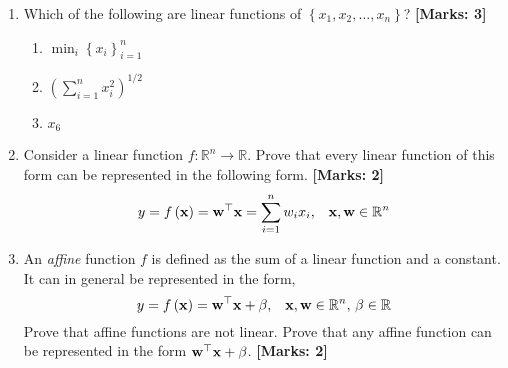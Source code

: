 \documentclass[12pt]{article}
\def\mf{\ensuremath\mathbf}
\begin{document}
\begin{enumerate}
    \item Which of the following are linear functions of $\left\{x_1, x_2, \ldots,x_n\right\}$? \textbf{[Marks: 3]}
    \begin{enumerate}
        \item $\min_i \left\{x_i\right\}_{i=1}^{n}$
        \item $\left(\sum_{i=1}^n x_i^2\right)^{1/2}$
        \item $x_6$
    \end{enumerate}
    
    \item Consider a linear function $f: \mathbb{R}^n \rightarrow \mathbb{R}$. Prove that every linear function of this form can be represented in the following form. \textbf{[Marks: 2]}
    \[ y = f\left(\mf{x}\right) = \mf{w}^\top\mf{x} = \sum_{i=1}^{n}w_ix_i, \,\,\,\,\, \mf{x}, \mf{w} \in \mathbb{R}^n \]

    \item An \textit{affine} function $f$ is defined as the sum of a linear function and a constant. It can in general be represented in the form, 
    \[ y = f\left(\mf{x}\right) = \mf{w}^\top\mf{x} + \beta, \,\,\,\,\, \mf{x}, \mf{w} \in \mathbb{R}^n, \, \beta \in \mathbb{R} \]
    Prove that affine functions are not linear. Prove that any affine function can be represented in the form $\mf{w}^\top\mf{x} + \beta$. \textbf{[Marks: 2]}

    

\end{enumerate}
\end{document}
